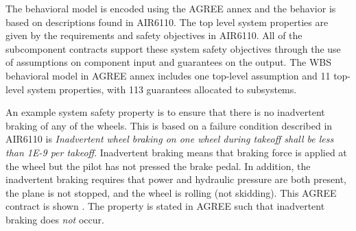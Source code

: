 


The behavioral model is encoded using the AGREE annex and the behavior is based on descriptions found in AIR6110. The top level system properties are given by the requirements and safety objectives in AIR6110. All of the subcomponent contracts support these system safety objectives through the use of assumptions on component input and guarantees on the output. The WBS behavioral model in AGREE annex includes one top-level assumption and  11 top-level system properties, with 113 guarantees allocated to subsystems.  

An example system safety property is to ensure that there is no inadvertent braking of any of the wheels. This is based on a failure condition described in AIR6110 is \textit{Inadvertent wheel braking on one wheel during takeoff shall be less than 1E-9 per takeoff}. 
Inadvertent braking means that braking force is applied at the wheel but the pilot has not pressed the brake pedal.  In addition, the inadvertent braking requires that power and hydraulic pressure are both present, the plane is not stopped, and the wheel is rolling (not skidding). This AGREE contract is shown . 
The property is stated in AGREE such that inadvertent braking does \textit{not} occur.


